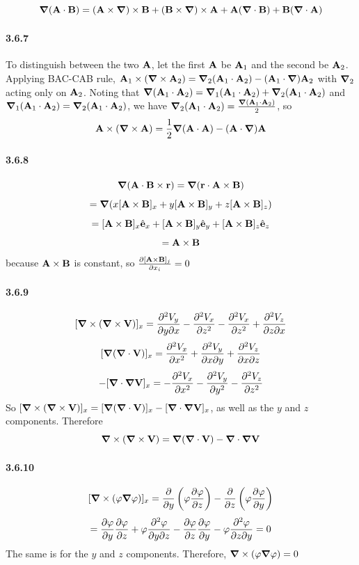 \documentclass[a4paper]{article}
\begin{document}
\[\del(\V{A}\cdot\V{B})=
(\V{A}\times\del)\times\V{B}+(\V{B}\times\del)\times\V{A}+\V{A}(\del\cdot\V{B})+\V{B}(\del\cdot\V{A})
\]

\paragraph{3.6.7}
To distinguish between the two $\V{A}$, let the first $\V{A}$ be $\V{A}_1$ and the second be $\V{A}_2$. Applying BAC-CAB rule,  $\V{A}_1\times(\del\times\V{A}_2)=\del_2(\V{A}_1\cdot \V{A}_2)-(\V{A}_1\cdot\del)\V{A}_2$ with $\del_2$ acting only on $\V{A}_2$. Noting that $\del(\V{A}_1\cdot \V{A}_2)=\del_1(\V{A}_1\cdot \V{A}_2)+\del_2(\V{A}_1\cdot \V{A}_2)$ and $\del_1(\V{A}_1\cdot \V{A}_2)=\del_2(\V{A}_1\cdot \V{A}_2)$, we have $\del_2(\V{A}_1\cdot \V{A}_2)=\frac{\del(\V{A}_1\cdot \V{A}_2)}{2}$, so \[\V{A}\times(\del\times\V{A})=\frac{1}{2}\del(\V{A}\cdot \V{A})-(\V{A}\cdot\del)\V{A}\]

\paragraph{3.6.8}
\[\del(\V{A}\cdot\V{B}\times\V{r})=\del(\V{r}\cdot\V{A}\times\V{B})\]\[=\del(x[\V{A}\times\V{B}]_x+y[\V{A}\times\V{B}]_y+z[\V{A}\times\V{B}]_z)\]\[=[\V{A}\times\V{B}]_x\VE_x+[\V{A}\times\V{B}]_y\VE_y+[\V{A}\times\V{B}]_z\VE_z\]\[=\V{A}\times\V{B}\]
because $\V{A}\times\V{B}$ is constant, so $\pdv{[\V{A}\times\V{B}]_j}{x_i}=0$

\paragraph{3.6.9}
\[
[\del\times(\del\times\V{V})]_x=\ppdv{V_y}{y}{x}-\pdv{^2V_x}{z^2}-\pdv{^2V_x}{z^2}+\ppdv{V_z}{z}{x}
\]
\[
[\del(\del\cdot\V{V})]_x=\pdv{^2V_x}{x^2}+\ppdv{V_y}{x}{y}+\ppdv{V_z}{x}{z}
\]
\[
-[\del\cdot\del\V{V}]_x=-\pdv{^2V_x}{x^2}-\pdv{^2V_y}{y^2}-\pdv{^2V_z}{z^2}
\]
So $[\del\times(\del\times\V{V})]_x=[\del(\del\cdot\V{V})]_x-[\del\cdot\del\V{V}]_x$, as well as the $y$ and $z$ components. Therefore
\[\del\times(\del\times\V{V})=\del(\del\cdot\V{V})-\del\cdot\del\V{V}\]

\paragraph{3.6.10}
\[
[\del\times(\varphi\del\varphi)]_x=\pdv{}{y}\left(\varphi\pdv{\varphi}{z}\right)-\pdv{}{z}\left(\varphi\pdv{\varphi}{y}\right)
\]
\[
=\pdv{\varphi}{y}\pdv{\varphi}{z}+\varphi\ppdv{\varphi}{y}{z}-\pdv{\varphi}{z}\pdv{\varphi}{y}-\varphi\ppdv{\varphi}{z}{y}=0
\]
The same is for the $y$ and $z$ components. Therefore,
$\del\times(\varphi\del\varphi)=0$
\end{document}
